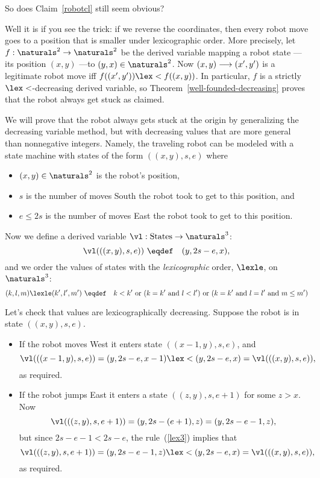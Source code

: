 \begin{editingnotes}
So does Claim~\ref{robotcl} still seem obvious?

Well it is if you see the trick: if we reverse the coordinates, then every
robot move goes to a position that is smaller under lexicographic order.
More precisely, let $f:\naturals^2 \to \naturals^2$ be the derived variable
mapping a robot state ---its position $(x,y)$ ---to $(y,x) \in
\naturals^2$.  Now $(x,y)\mathrel{\longrightarrow} (x',y')$ is a legitimate robot move iff
$f((x',y')) \lex< f((x,y))$.  In particular, $f$ is a strictly
$\lex<$-decreasing derived variable, so
Theorem~\ref{well-founded-decreasing} proves that the robot always get
stuck as claimed.
\fi


\iffalse

We will prove that the robot always gets stuck at the origin by
generalizing the decreasing variable method, but with decreasing values
that are more general than nonnegative integers.  Namely, the traveling robot
can be modeled with a state machine with states of the form $((x,y),s,e)$
where
\begin{itemize}
\item $(x,y) \in \naturals^2$ is the robot's position,
\item $s$ is the number of moves South the robot took to get to this
position, and
\item $e \le 2s$ is the number of moves East the robot took to get to this
position. 
\end{itemize}

Now we define a derived variable $\vl:\text{States}\to \naturals^3$:
\[
\vl(((x,y),s,e)) \ \eqdef\quad (y,2s-e,x),
\]
and we order the values of states with the \emph{lexicographic} order,
$\lexle$, on $\naturals^3$:
\begin{equation}\label{lex3}
(k,l,m) \lexle (k',l',m') \ \eqdef\quad k < k' \text{ or } (k=k' \text{
and } l < l') \text{ or } (k=k' \text{ and } l = l' \text{ and } m \le m')
\end{equation}

Let's check that values are lexicographically decreasing.  Suppose the
robot is in state $((x,y),s,e)$.
\begin{itemize}
\item If the robot moves West it enters state $((x-1,y),s,e)$, and
\[
\vl(((x-1,y),s,e)) = (y,2s-e,x-1) \lex< (y,2s-e,x) = \vl(((x,y),s,e)),
\]
as required.


\item If the robot jumps East it enters a state $((z,y),s,e+1)$ for some
$z>x$.  Now
\[
\vl(((z,y),s,e+1)) = (y,2s-(e+1),z) = (y,2s-e-1,z),
\]
but since $2s-e-1 < 2s-e$, the rule~(\ref{lex3}) implies that
\[
\vl(((z,y),s,e+1)) = (y,2s-e-1,z)  \lex< (y,2s-e,x) = \vl(((x,y),s,e)),
\]
as required.


\end{itemize}
\end{editingnotes}
